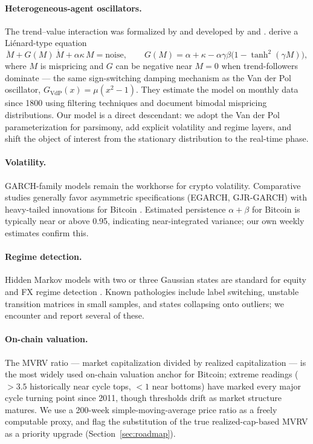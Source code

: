 \documentclass[11pt,a4paper]{article}
\begin{document}
\paragraph{Heterogeneous-agent oscillators.} The trend--value interaction was formalized by \citet{chiarella1992dynamics} and developed by \citet{lux1999scaling} and \citet{hommes2006heterogeneous}. \citet{majewski2020co} derive a Li\'enard-type equation
\begin{equation}
\ddot{M} + G(M)\,\dot{M} + \alpha\kappa\,M = \text{noise}, \qquad
G(M) = \alpha + \kappa - \alpha\gamma\beta\big(1 - \tanh^2(\gamma M)\big),
\label{eq:bouchaud}
\end{equation}
where $M$ is mispricing and $G$ can be negative near $M=0$ when trend-followers dominate --- the same sign-switching damping mechanism as the Van der Pol oscillator, $G_{\text{VdP}}(x) = \mu(x^2 - 1)$. They estimate the model on monthly data since 1800 using filtering techniques and document bimodal mispricing distributions. Our model is a direct descendant: we adopt the Van der Pol parameterization for parsimony, add explicit volatility and regime layers, and shift the object of interest from the stationary distribution to the real-time phase.

\paragraph{Volatility.} GARCH-family models remain the workhorse for crypto volatility. Comparative studies generally favor asymmetric specifications (EGARCH, GJR-GARCH) with heavy-tailed innovations for Bitcoin \citep{katsiampa2017volatility,chu2017garch}. Estimated persistence $\alpha+\beta$ for Bitcoin is typically near or above 0.95, indicating near-integrated variance; our own weekly estimates confirm this.

\paragraph{Regime detection.} Hidden Markov models with two or three Gaussian states are standard for equity and FX regime detection \citep{ang2012regime,nystrup2017dynamic}. Known pathologies include label switching, unstable transition matrices in small samples, and states collapsing onto outliers; we encounter and report several of these.

\paragraph{On-chain valuation.} The MVRV ratio --- market capitalization divided by realized capitalization --- is the most widely used on-chain valuation anchor for Bitcoin; extreme readings ($>3.5$ historically near cycle tops, $<1$ near bottoms) have marked every major cycle turning point since 2011, though thresholds drift as market structure matures. We use a 200-week simple-moving-average price ratio as a freely computable proxy, and flag the substitution of the true realized-cap-based MVRV as a priority upgrade (Section~\ref{sec:roadmap}).
\end{document}
